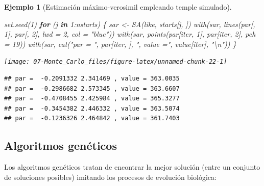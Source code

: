 \documentclass[
]{book}
\newenvironment{Shaded}{\begin{snugshade}}{\end{snugshade}}
\newcommand{\AttributeTok}[1]{\textcolor[rgb]{0.77,0.63,0.00}{#1}}
\newcommand{\ControlFlowTok}[1]{\textcolor[rgb]{0.13,0.29,0.53}{\textbf{#1}}}
\newcommand{\DecValTok}[1]{\textcolor[rgb]{0.00,0.00,0.81}{#1}}
\newcommand{\FunctionTok}[1]{\textcolor[rgb]{0.00,0.00,0.00}{#1}}
\newcommand{\NormalTok}[1]{#1}
\newcommand{\OtherTok}[1]{\textcolor[rgb]{0.56,0.35,0.01}{#1}}
\newcommand{\SpecialCharTok}[1]{\textcolor[rgb]{0.00,0.00,0.00}{#1}}
\newcommand{\StringTok}[1]{\textcolor[rgb]{0.31,0.60,0.02}{#1}}
\theoremstyle{break}
\newtheorem{example}{Ejemplo}[chapter]
\theoremstyle{nonumberplain}
\begin{document}
\begin{example}[Estimación máximo-verosimil empleando temple simulado]
\begin{Shaded}
\begin{Highlighting}[]
\FunctionTok{set.seed}\NormalTok{(}\DecValTok{1}\NormalTok{)}
\ControlFlowTok{for}\NormalTok{ (j }\ControlFlowTok{in} \DecValTok{1}\SpecialCharTok{:}\NormalTok{nstarts) \{}
\NormalTok{  sar }\OtherTok{\textless{}{-}} \FunctionTok{SA}\NormalTok{(like, starts[j, ])}
  \FunctionTok{with}\NormalTok{(sar, }\FunctionTok{lines}\NormalTok{(par[, }\DecValTok{1}\NormalTok{], par[, }\DecValTok{2}\NormalTok{], }\AttributeTok{lwd =} \DecValTok{2}\NormalTok{, }\AttributeTok{col =} \StringTok{"blue"}\NormalTok{))}
  \FunctionTok{with}\NormalTok{(sar, }\FunctionTok{points}\NormalTok{(par[iter, }\DecValTok{1}\NormalTok{], par[iter, }\DecValTok{2}\NormalTok{], }\AttributeTok{pch =} \DecValTok{19}\NormalTok{))}
  \FunctionTok{with}\NormalTok{(sar, }\FunctionTok{cat}\NormalTok{(}\StringTok{"par = "}\NormalTok{, par[iter, ], }\StringTok{", value ="}\NormalTok{, value[iter], }\StringTok{"}\SpecialCharTok{\textbackslash{}n}\StringTok{"}\NormalTok{))}
\NormalTok{\}}
\end{Highlighting}
\end{Shaded}

\begin{center}\texttt{[image: 07-Monte\_Carlo\_files/figure-latex/unnamed-chunk-22-1]} \end{center}

\begin{verbatim}
## par =  -0.2091332 2.341469 , value = 363.0035 
## par =  -0.2986682 2.573345 , value = 363.6607 
## par =  -0.4708455 2.425984 , value = 365.3277 
## par =  -0.3454382 2.446332 , value = 363.5074 
## par =  -0.1236326 2.464842 , value = 361.7403
\end{verbatim}

\end{example}

\hypertarget{algoritmos-genuxe9ticos}{%
\subsection{Algoritmos genéticos}\label{algoritmos-genuxe9ticos}}

Los algoritmos genéticos tratan de encontrar la mejor solución
(entre un conjunto de soluciones posibles) imitando los procesos de
evolución biológica:
\end{document}
